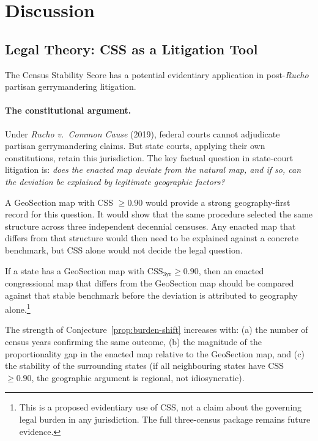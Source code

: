 \section{Discussion}
\label{sec:discussion}

\subsection{Legal Theory: CSS as a Litigation Tool}
\label{sec:legal}

The Census Stability Score has a potential evidentiary application in
post-\emph{Rucho} partisan gerrymandering litigation.

\paragraph{The constitutional argument.}
Under \emph{Rucho v.\ Common Cause} (2019), federal courts cannot adjudicate
partisan gerrymandering claims.
But state courts, applying their own constitutions, retain this jurisdiction.
The key factual question in state-court litigation is: \emph{does the enacted
map deviate from the natural map, and if so, can the deviation be explained
by legitimate geographic factors?}

A GeoSection map with CSS $\geq 0.90$ would provide a strong geography-first
record for this question.
It would show that the same procedure selected the same structure across three
independent decennial censuses.  Any enacted map that differs from that
structure would then need to be explained against a concrete benchmark, but CSS
alone would not decide the legal question.

\begin{conjecture}
\label{prop:burden-shift}
If a state has a GeoSection map with CSS$_{3\text{yr}} \geq 0.90$, then
an enacted congressional map that differs from the GeoSection map should be
compared against that stable benchmark before the deviation is attributed to
geography alone.\footnote{This is a proposed evidentiary use of CSS, not a
claim about the governing legal burden in any jurisdiction.  The full
three-census package remains future evidence.}
\end{conjecture}

The strength of Conjecture~\ref{prop:burden-shift} increases with:
(a) the number of census years confirming the same outcome,
(b) the magnitude of the proportionality gap in the enacted map relative
to the GeoSection map, and
(c) the stability of the surrounding states (if all neighbouring states
have CSS $\geq 0.90$, the geographic argument is regional, not idiosyncratic).


